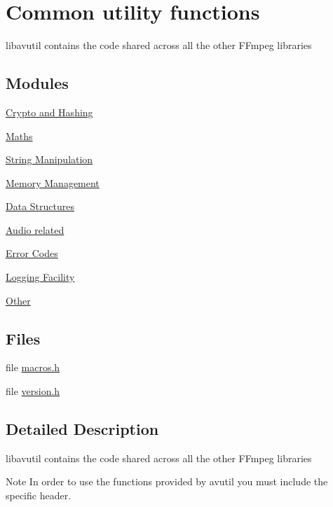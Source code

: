 \hypertarget{group__lavu}{}\section{Common utility functions}
\label{group__lavu}


libavutil contains the code shared across all the other F\+Fmpeg libraries  


\subsection*{Modules}
\begin{DoxyCompactItemize}
\item 
\hyperlink{group__lavu__crypto}{Crypto and Hashing}
\item 
\hyperlink{group__lavu__math}{Maths}
\item 
\hyperlink{group__lavu__string}{String Manipulation}
\item 
\hyperlink{group__lavu__mem}{Memory Management}
\item 
\hyperlink{group__lavu__data}{Data Structures}
\item 
\hyperlink{group__lavu__audio}{Audio related}
\item 
\hyperlink{group__lavu__error}{Error Codes}
\item 
\hyperlink{group__lavu__log}{Logging Facility}
\item 
\hyperlink{group__lavu__misc}{Other}
\end{DoxyCompactItemize}
\subsection*{Files}
\begin{DoxyCompactItemize}
\item 
file \hyperlink{ffmpeg_2libavutil_2macros_8h}{macros.\+h}
\item 
file \hyperlink{ffmpeg_2libavutil_2version_8h}{version.\+h}
\end{DoxyCompactItemize}


\subsection{Detailed Description}
libavutil contains the code shared across all the other F\+Fmpeg libraries 

\begin{DoxyNote}{Note}
In order to use the functions provided by avutil you must include the specific header. 
\end{DoxyNote}
